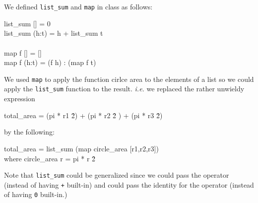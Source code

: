 \documentclass[11pt]{article}
\begin{document}

\section{}

We defined {\tt{list\_sum}} and {\tt{map}} in class as follows:

\begin{program*}
\> list\_sum [] = 0 \\
\> list\_sum (h:t) = h + list\_sum  t\\
\> \\
\> map f [] = [] \\
\> map f (h:t) = (f h) : (map f t)
\end{program*}

We used {\tt{map}} to apply the function cirlce area to the elements
of a list so we could apply the {\tt{list\_sum}} function to the result.
{\em{i.e.}} we replaced the rather unwieldy expression

\begin{program*} 
\> total\_area = (pi * r1 \^ 2) + (pi * r2 \^ 2 ) + (pi * r3 \^ 2)
\end{program*}

by the following:

\begin{program*}
\> total\_area = list\_sum (map circle\_area [r1,r2,r3]) \\
\>                 where circle\_area r  = pi * r \^ 2\\
\end{program*}

Note that {\tt{list\_sum}} could be generalized since we could pass the
operator (instead of having {\tt{+}} built-in) and could pass the identity for
the operator (instead of having {\tt{0}} built-in.)
\end{document}
